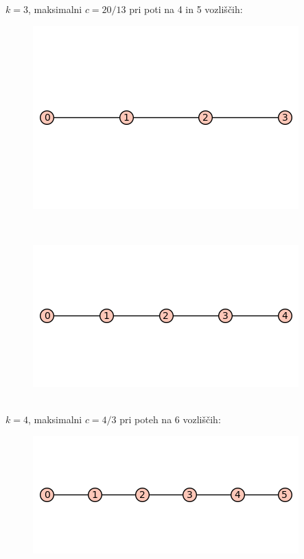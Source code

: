\documentclass[12pt, a4paper]{article}
\begin{document}
$k=3$, maksimalni $c=20/13$ pri poti na 4 in 5 vozliščih:\\

\begin{figure}[h!]
\centering
\includegraphics[width=\linewidth]{4-pot}
\end{figure} \\

\begin{figure}[h!]
\centering
\includegraphics[width=\linewidth]{5-pot}
\end{figure} \\

$k=4$, maksimalni $c=4/3$ pri poteh na 6 vozliščih:\\

\begin{figure}[h!]
\centering
\includegraphics[width=\linewidth]{6-pot}
\end{figure} \\
\end{document}
